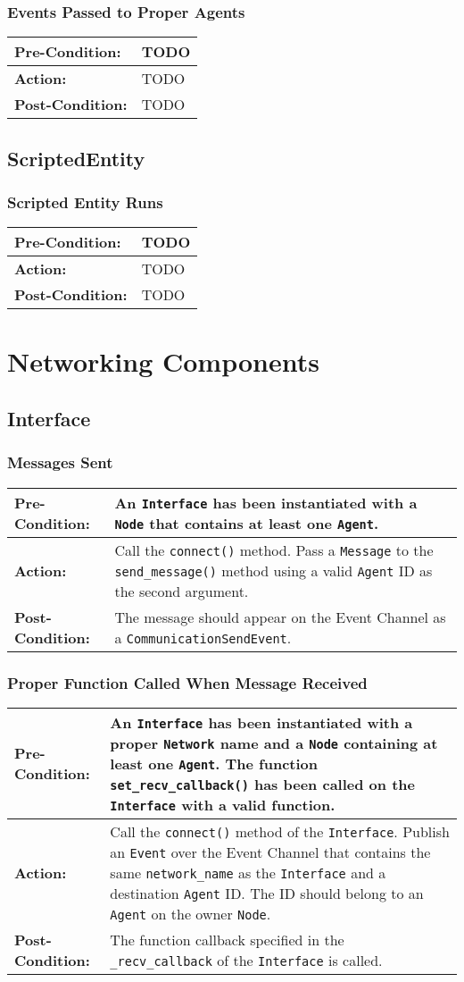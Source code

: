 \documentclass[titlepage]{article}
\newcommand{\testcase}[3]{
    \begin{center}
    \begin{tabular}{| l | p{0.7\textwidth}|}
        \hline
        \rowcolor[gray]{0.8}\textbf{Pre-Condition:} & #1 \\ \hline
        \textbf{Action:} & #2 \\ \hline
        \rowcolor[gray]{0.8}\textbf{Post-Condition:} & #3 \\ \hline
    \end{tabular}
    \end{center}
}
\begin{document}
\subsubsection{Events Passed to Proper Agents}
\testcase{TODO}{TODO}{TODO}

\subsection{ScriptedEntity}
\subsubsection{Scripted Entity Runs}
\testcase{TODO}{TODO}{TODO}

\section{Networking Components}
\subsection{Interface}
\subsubsection{Messages Sent}
\testcase{An \texttt{Interface} has been instantiated with a \texttt{Node} that contains at least one \texttt{Agent}.}{Call the \texttt{connect()} method. Pass a \texttt{Message} to the \texttt{send\_message()} method using a valid \texttt{Agent} ID as the second argument.}{The message should appear on the Event Channel as a \texttt{CommunicationSendEvent}.}

\subsubsection{Proper Function Called When Message Received}
\testcase{An \texttt{Interface} has been instantiated with a proper \texttt{Network} name and a \texttt{Node} containing at least one \texttt{Agent}. The function \texttt{set\_recv\_callback()} has been called on the \texttt{Interface} with a valid function.}{Call the \texttt{connect()} method of the \texttt{Interface}. Publish an \texttt{Event} over the Event Channel that contains the same \texttt{network\_name} as the \texttt{Interface} and a destination \texttt{Agent} ID. The ID should belong to an \texttt{Agent} on the owner \texttt{Node}.}{The function callback specified in the \texttt{\_recv\_callback} of the \texttt{Interface} is called.}
\end{document}
